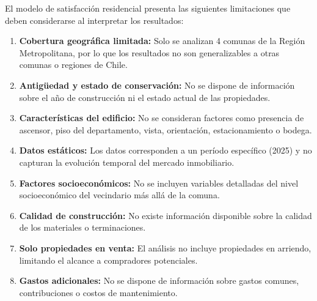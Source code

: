 El modelo de satisfacción residencial presenta las siguientes limitaciones que deben considerarse al interpretar los resultados:

\begin{enumerate}
    \item \textbf{Cobertura geográfica limitada:} Solo se analizan 4 comunas de la Región Metropolitana, por lo que los resultados no son generalizables a otras comunas o regiones de Chile.
    
    \item \textbf{Antigüedad y estado de conservación:} No se dispone de información sobre el año de construcción ni el estado actual de las propiedades.
    
    \item \textbf{Características del edificio:} No se consideran factores como presencia de ascensor, piso del departamento, vista, orientación, estacionamiento o bodega.
    
    \item \textbf{Datos estáticos:} Los datos corresponden a un período específico (2025) y no capturan la evolución temporal del mercado inmobiliario.
    
    \item \textbf{Factores socioeconómicos:} No se incluyen variables detalladas del nivel socioeconómico del vecindario más allá de la comuna.
    
    \item \textbf{Calidad de construcción:} No existe información disponible sobre la calidad de los materiales o terminaciones.
    
    \item \textbf{Solo propiedades en venta:} El análisis no incluye propiedades en arriendo, limitando el alcance a compradores potenciales.
    
    \item \textbf{Gastos adicionales:} No se dispone de información sobre gastos comunes, contribuciones o costos de mantenimiento.
\end{enumerate}
